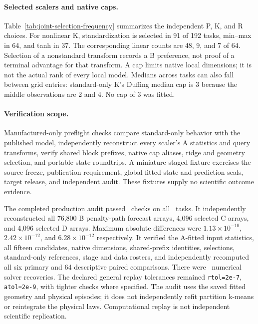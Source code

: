 \paragraph{Selected scalers and native caps.}
Table~\ref{tab:joint-selection-frequency} summarizes the independent
P, K, and R choices. For nonlinear K, standardization is selected
in 91 of 192 tasks, min--max in 64, and tanh in 37. The corresponding
linear counts are 48, 9, and 7 of 64. Selection of a nonstandard
transform records a B preference, not proof of a terminal advantage
for that transform. A cap limits native local dimensions; it is
not the actual rank of every local model. Medians across tasks
can also fall between grid entries: standard-only K's Duffing
median cap is 3 because the middle observations are 2 and 4.
No cap of 3 was fitted.

\begin{table}[tbp]
\centering\small
\setlength{\tabcolsep}{4pt}

\caption{Independent joint selections by population and arm. Scaler
counts sum to 192 nonlinear or 64 linear tasks per arm. Reported
cap summaries concern selected upper bounds, not a common realized
local rank. Frequencies are descriptive and use B alone.}
\label{tab:joint-selection-frequency}
\end{table}

\paragraph{Verification scope.}
Manufactured-only preflight checks compare standard-only behavior
with the published model, independently reconstruct every scaler's
A statistics and query transforms, verify shared block prefixes,
native cap aliases, ridge and geometry selection, and portable-state
roundtrips. A miniature staged fixture exercises the source freeze,
publication requirement, global fitted-state and prediction seals,
target release, and independent audit. These fixtures supply no
scientific outcome evidence.

The completed production audit passed \JSAuditChecks\ checks on
all \JSTasks\ tasks. It independently reconstructed all
76,800 B penalty-path forecast arrays, 4,096 selected C arrays,
and 4,096 selected D arrays. Maximum absolute differences were
$1.13\times10^{-10}$, $2.42\times10^{-12}$, and
$6.28\times10^{-12}$ respectively. It verified the A-fitted
input statistics, all fifteen candidates, native dimensions,
shared-prefix identities, selections, standard-only references,
stage and data rosters, and independently recomputed all six
primary and 64 descriptive paired comparisons. There were
\JSSolverRecoveries\ numerical solver recoveries.
The declared general replay tolerances remained
\texttt{rtol=2e-7}, \texttt{atol=2e-9}, with tighter checks where
specified. The audit uses the saved fitted geometry and physical
episodes; it does not independently refit partition k-means or
reintegrate the physical laws. Computational replay is not
independent scientific replication.

